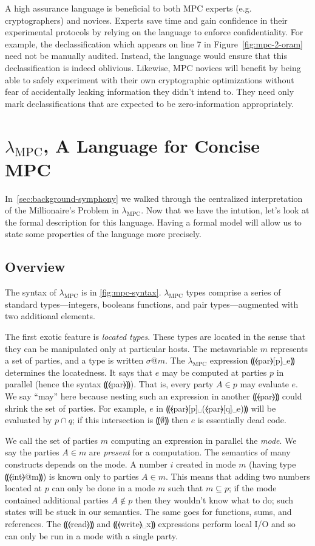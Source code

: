 \documentclass{report}
\newcommand{\mpc}{\ensuremath{\lambda_{\mathrm{MPC}}}\xspace}
\newcommand{\eset}{⸨∅⸩}
\begin{document}
A high assurance language is beneficial to both MPC experts (e.g. cryptographers) and novices. Experts save time and gain confidence in their
experimental protocols by relying on the language to enforce confidentiality. For example, the declassification which appears on line 7 in
Figure~\ref{fig:mpc-2-oram} need not be manually audited. Instead, the language would ensure that this declassification is indeed
oblivious. Likewise, MPC novices will benefit by being able to safely experiment with their own cryptographic optimizations
without fear of accidentally leaking information they didn't intend to. They need only mark declassifications that are expected to be
zero-information appropriately.

\chapter{\mpc, A Language for Concise MPC}
\label{ch:lam-mpc}

In~\cref{sec:background-symphony} we walked through the centralized interpretation of the Millionaire's Problem in \mpc. Now that we have
the intution, let's look at the formal description for this language. Having a formal model will allow us to state some properties of the
language more precisely.

\section{Overview}
\label{sec:lam-mpc-overview}

The syntax of \mpc is in \cref{fig:mpc-syntax}. \mpc types comprise a
series of standard types---integers, booleans functions, and pair types---augmented
with two additional elements.

The first exotic feature is \emph{located types}. These types are located
in the sense that they can be manipulated only at particular hosts.
The metavariable $m$ represents a set of parties, and a type is written $\sigma @ m$. The \mpc expression
⸨⦑par⦒[p]␣e⸩ determines the locatedness. It says that $e$ may be computed at
parties $p$ in parallel (hence the syntax ⸨⦑par⦒⸩). That is, every
party $A \in p$ may evaluate $e$. We say ``may'' here because
nesting such an expression in another ⸨⦑par⦒⸩ could shrink the set of
parties. For example, $e$ in ⸨⦑par⦒[p]␣(⦑par⦒[q]␣e)⸩ will be
evaluated by $p \cap q$; if this intersection is $\eset$ then $e$
is essentially dead code.

We call the set of parties $m$ computing an expression in parallel
the \emph{mode}. We say the parties $A \in m$ are \emph{present}
for a computation. The semantics of many constructs depends on the
mode. A number $i$ created in mode $m$ (having type ⸨⦑int⦒@m⸩) is
known only to parties $A \in m$. This means that adding two numbers
located at $p$ can only be done in a mode $m$ such that
$m \subseteq p$; if the mode contained additional parties
$A \not\in p$ then they wouldn't know what to do; such states will be
stuck in our semantics. The same goes for functions, sums, and
references. The ⸨⦑read⦒⸩ and ⸨⦑write⦒␣x⸩ expressions perform local
I/O and so can only be run in a mode with a single party.
\end{document}
